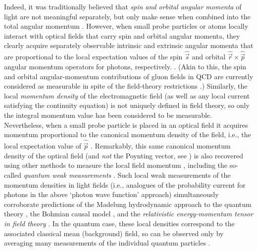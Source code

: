 \documentclass[1p,sort&compress]{elsarticle}
\numberwithin{equation}{section}
\newcommand{\rv}[1]{\vec{#1}}
\begin{document}
Indeed, it was traditionally believed that \emph{spin and orbital angular momenta} of light are not meaningful separately, but only make sense when combined into the total angular momentum \cite{Akhiezer1965,Berestetskii1982,Cohen1997}. However, when small probe particles or atoms locally interact with optical fields that carry spin and orbital angular momenta, they clearly acquire separately observable intrinsic and extrinsic angular momenta that are proportional to the local expectation values of the spin $\hat{\rv{s}}$ and orbital $\hat{\rv{r}}\times\hat{\rv{p}}$ angular momentum operators for photons, respectively. \cite{Enk1994,O'Neil2002,Garces2003,Curtis2003,Zhao2007,Adachi2007,Roy2014,Bliokh2013b,Bliokh2014}. (Akin to this, the spin and orbital angular-momentum contributions of gluon fields in QCD are currently considered as measurable in spite of the field-theory restrictions \cite{Leader2014}.) Similarly, the local \emph{momentum density} of the electromagnetic field (as well as any local current satisfying the continuity equation) is not uniquely defined in field theory, so only the integral momentum value has been considered to be measurable. Nevertheless, when a small probe particle is placed in an optical field it acquires momentum proportional to the canonical momentum density of the field, i.e., the local expectation value of $\hat{\rv{p}}$ \cite{Berry2009,Bliokh2013a,Bliokh2013c}. Remarkably, this same canonical momentum density of the optical field (and \emph{not} the Poynting vector, see \cite{Berry2009,Bliokh2013,Bliokh2013b,Bliokh2013c}) is also recovered using other methods to measure the local field momentum \cite{Arlt2003,Leach2006,Yeganeh2013,Terborg2013,Huard1978,Huard1979,Barnett2013}, including the so-called \emph{quantum weak measurements} \cite{Kocsis2011,Wiseman2007,Traversa2013,Bliokh2013a,Dressel2014b}. Such local weak measurements of the momentum densities in light fields (i.e., analogues of the probability current for photons in the above `photon wave function' approach) simultaneously corroborate predictions of the Madelung hydrodynamic approach to the quantum theory \cite{Madelung1926,Madelung1927}, the Bohmian causal model \cite{Bohm1952a,Bohm1952b}, and the \emph{relativistic energy-momentum tensor in field theory} \cite{Hiley2012,Bliokh2013,Bliokh2013a,Bliokh2013b}.  In the quantum case, these local densities correspond to the associated classical mean (background) field, so can be observed only by averaging many measurements of the individual quantum particles \cite{Dressel2014b}.
\end{document}
